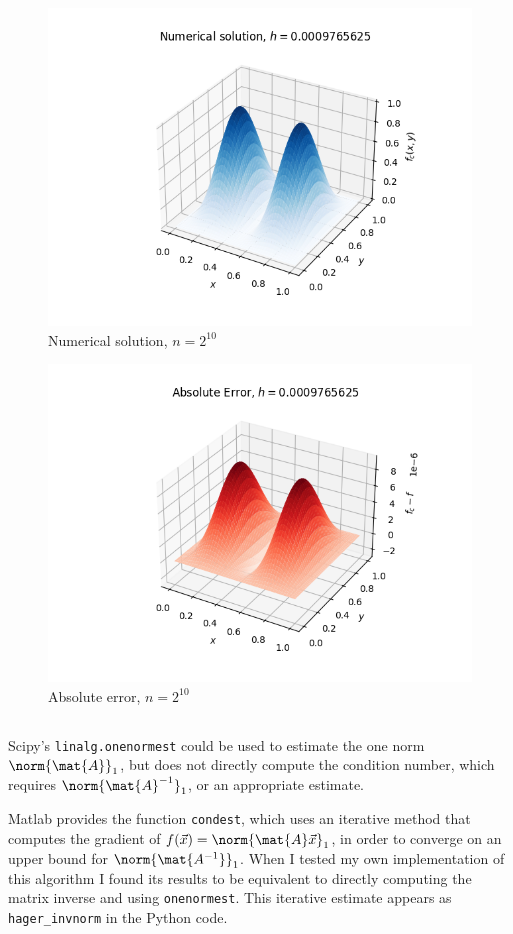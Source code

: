 \documentclass{template}
\begin{document}
\begin{figure}
    \centering
    \includegraphics[width=0.65\linewidth]{num_soln.png}
    \caption{Numerical solution, $n=2^{10}$}
    \label{fig:numerical_solution}
\end{figure}

\begin{figure}
    \centering
    \includegraphics[width=0.65\linewidth]{abs_errs.png}
    \caption{Absolute error, $n=2^{10}$}
    \label{fig:numerical_error}
\end{figure}




\subsection{} 

Scipy's \verb|linalg.onenormest| could be used to estimate the one norm $\norm{\mat{A}}_1$, but does not directly compute the condition number, which requires $\norm{\mat{A}^{-1}}_1$, or an appropriate estimate.

Matlab provides the function \verb|condest|, which uses an iterative method \cite{hager1984condition} that computes the gradient of $f(\vec{x}) = \norm{\mat{A}\vec{x}}_1$, in order to converge on an upper bound for $\norm{\mat{A^{-1}}}_1$. When I tested my own implementation of this algorithm I found its results to be equivalent to directly computing the matrix inverse and using \verb|onenormest|. This iterative estimate appears as \verb|hager_invnorm| in the Python code.
\end{document}
